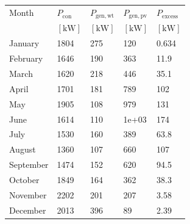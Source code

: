 \begin{table}
\label{tab: MonthlyPower}
\begin{tabular}{lllll}
\toprule
Month & $P_{\mathrm{con}}$ & $P_{\mathrm{gen,wt}}$ & $P_{\mathrm{gen,pv}}$ & $P_{\mathrm{excess}}$ \\
 & $\left[\mathrm{kW}\right]$ & $\left[\mathrm{kW}\right]$ & $\left[\mathrm{kW}\right]$ & $\left[\mathrm{kW}\right]$ \\
\midrule
January & 1804 & 275 & 120 & 0.634 \\
February & 1646 & 190 & 363 & 11.9 \\
March & 1620 & 218 & 446 & 35.1 \\
April & 1701 & 181 & 789 & 102 \\
May & 1905 & 108 & 979 & 131 \\
June & 1614 & 110 & 1e+03 & 174 \\
July & 1530 & 160 & 389 & 63.8 \\
August & 1360 & 107 & 660 & 107 \\
September & 1474 & 152 & 620 & 94.5 \\
October & 1849 & 164 & 362 & 38.3 \\
November & 2202 & 201 & 207 & 3.58 \\
December & 2013 & 396 & 89 & 2.39 \\
\bottomrule
\end{tabular}
\end{table}
